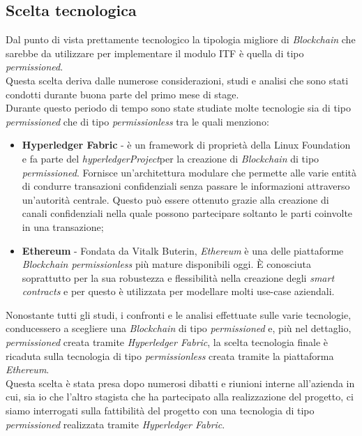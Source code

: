 \subsection{Scelta tecnologica}
Dal punto di vista prettamente tecnologico la tipologia migliore di \textit{Blockchain} che sarebbe da utilizzare per implementare il modulo \gls{ITF} è quella di tipo \textit{permissioned}.\\
Questa scelta deriva dalle numerose considerazioni, studi e analisi che sono stati condotti durante buona parte del primo mese di stage.\\
Durante questo periodo di tempo sono state studiate molte tecnologie sia di tipo \textit{permissioned} che di tipo \textit{permissionless} tra le quali menziono:
\begin{itemize}
	\item \textbf{Hyperledger Fabric} - è un framework di proprietà della Linux Foundation\cite{linuxFoundation} e fa parte del \emph{\gls{hyperledgerProject}}\glsfirstoccur per la creazione di \textit{Blockchain} di tipo \textit{permissioned}. Fornisce un'architettura modulare che permette alle varie entità di condurre transazioni confidenziali senza passare le informazioni attraverso un'autorità centrale. Questo può essere ottenuto grazie alla creazione di canali confidenziali nella quale possono partecipare soltanto le parti coinvolte in una transazione;
	\item \textbf{Ethereum} - Fondata da Vitalk Buterin, \textit{Ethereum} è una delle piattaforme \textit{Blockchain permissionless} più mature disponibili oggi.
	È conosciuta soprattutto per la sua robustezza e flessibilità nella creazione degli \textit{smart contracts} e per questo è utilizzata per modellare molti use-case aziendali\cite{ethereumProject}.
\end{itemize}
Nonostante tutti gli studi, i confronti e le analisi effettuate sulle varie tecnologie, conducessero a scegliere una \textit{Blockchain} di tipo \textit{permissioned} e, più nel dettaglio, \textit{permissioned} creata tramite \textit{Hyperledger Fabric}, la scelta tecnologia finale è ricaduta sulla tecnologia di tipo \textit{permissionless} creata tramite la piattaforma \textit{Ethereum}.\\
Questa scelta è stata presa dopo numerosi dibatti e riunioni interne all'azienda in cui, sia io che l'altro stagista che ha partecipato alla realizzazione del progetto, ci siamo interrogati sulla fattibilità del progetto con una tecnologia di tipo \textit{permissioned} realizzata tramite \textit{Hyperledger Fabric}.\\
